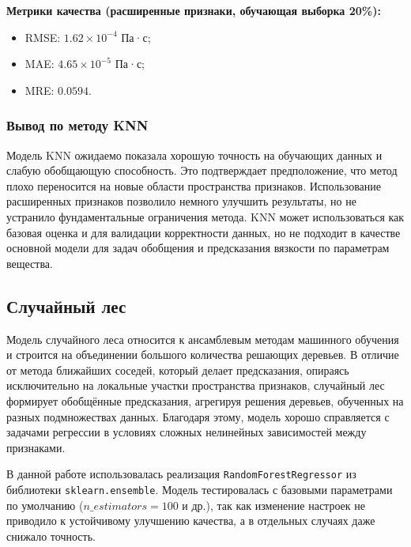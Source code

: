 \documentclass[a4paper,12pt]{article}
\begin{document}
      \begin{minipage}{\textwidth}
        \textbf{Метрики качества (расширенные признаки, обучающая выборка 20\%):}
        \begin{itemize}
          \item RMSE: \( 1.62 \times 10^{-4} \) Па·с;
          \item MAE: \( 4.65 \times 10^{-5} \) Па·с;
          \item MRE: \( 0.0594 \).
        \end{itemize}
      \end{minipage}

    \subsubsection{Вывод по методу KNN}

      Модель KNN ожидаемо показала хорошую точность на обучающих данных и слабую обобщающую способность. Это подтверждает предположение, что метод плохо переносится на новые области пространства признаков. Использование расширенных признаков позволило немного улучшить результаты, но не устранило фундаментальные ограничения метода. KNN может использоваться как базовая оценка и для валидации корректности данных, но не подходит в качестве основной модели для задач обобщения и предсказания вязкости по параметрам вещества.


  \subsection{Случайный лес}

    Модель случайного леса относится к ансамблевым методам машинного обучения и строится на объединении большого количества решающих деревьев. В отличие от метода ближайших соседей, который делает предсказания, опираясь исключительно на локальные участки пространства признаков, случайный лес формирует обобщённые предсказания, агрегируя решения деревьев, обученных на разных подмножествах данных. Благодаря этому, модель хорошо справляется с задачами регрессии в условиях сложных нелинейных зависимостей между признаками.
    
    В данной работе использовалась реализация \texttt{RandomForestRegressor} из библиотеки \texttt{sklearn.ensemble}. Модель тестировалась с базовыми параметрами по умолчанию (\( n\_estimators = 100 \) и др.), так как изменение настроек не приводило к устойчивому улучшению качества, а в отдельных случаях даже снижало точность.
    
\end{document}
